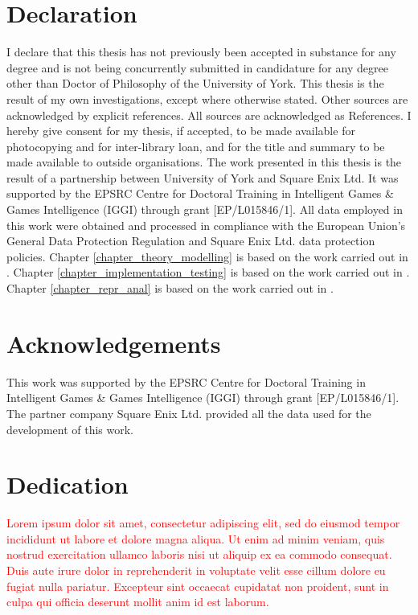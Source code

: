 \documentclass{yorkThesis}
\newcommand{\lorem}{\textcolor{red}{Lorem ipsum dolor sit amet, consectetur adipiscing elit, sed do eiusmod tempor incididunt ut labore et dolore magna aliqua. Ut enim ad minim veniam, quis nostrud exercitation ullamco laboris nisi ut aliquip ex ea commodo consequat. Duis aute irure dolor in reprehenderit in voluptate velit esse cillum dolore eu fugiat nulla pariatur. Excepteur sint occaecat cupidatat non proident, sunt in culpa qui officia deserunt mollit anim id est laborum.\\}}
\begin{document}
\chapter*{Declaration}
\label{declaration}
 I declare that this thesis has not previously been accepted in substance for any degree and is not being concurrently submitted in candidature for any degree other than Doctor of Philosophy of the University of York. This thesis is the result of my own investigations, except where otherwise stated. Other sources are acknowledged by explicit references. All sources are acknowledged as References. I hereby give consent for my thesis, if accepted, to be made available for photocopying and for inter-library loan, and for the title and summary to be made available to outside organisations. The work presented in this thesis is the result of a partnership between University of York and Square Enix Ltd. It was supported by the EPSRC Centre for Doctoral Training in Intelligent Games \& Games Intelligence (IGGI) through grant [EP/L015846/1]. All data employed in this work were obtained and processed in compliance with the European Union's General Data Protection Regulation \cite{EUdataregulations2018} and Square Enix Ltd. data protection policies. Chapter \ref{chapter_theory_modelling} is based on the work carried out in \cite{bonometti2020theory, bonometti2021approximating}. Chapter \ref{chapter_implementation_testing} is based on the work carried out in \cite{bonometti2019modelling, bonometti2020theory, bonometti2021approximating}. Chapter \ref{chapter_repr_anal} is based on the work carried out in \cite{bonometti2021approximating}.

\chapter*{Acknowledgements}
\label{acknowledgements}
This work was supported by the EPSRC Centre for Doctoral Training in Intelligent Games \& Games Intelligence (IGGI) through grant [EP/L015846/1]. The partner company Square Enix Ltd. provided all the data used for the development of this work.

\chapter*{Dedication}
\label{dedication}
\lorem

\end{document}
